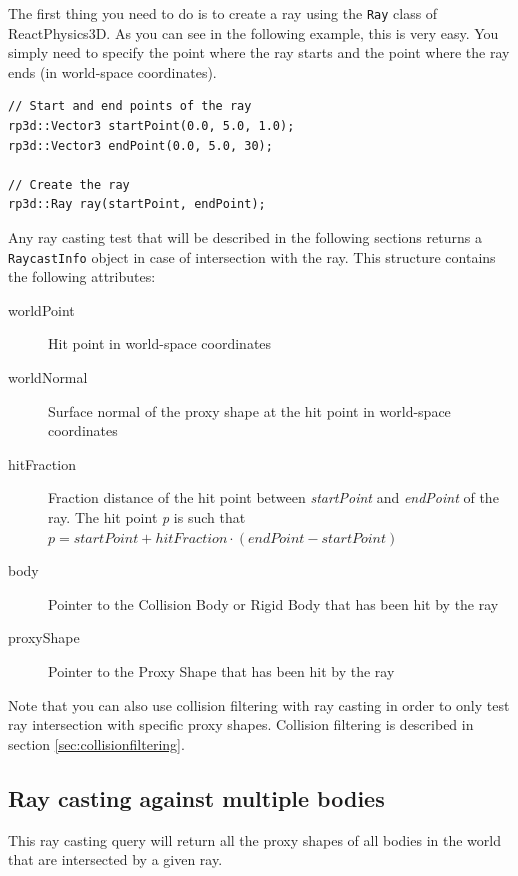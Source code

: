 \documentclass[a4paper,12pt]{article}
\begin{document}
    The first thing you need to do is to create a ray using the \texttt{Ray} class of ReactPhysics3D. As you can see in the following example, this is very easy. You
    simply need to specify the point where the ray starts and the point where the ray ends (in world-space coordinates). \\

    \begin{lstlisting}
// Start and end points of the ray
rp3d::Vector3 startPoint(0.0, 5.0, 1.0);
rp3d::Vector3 endPoint(0.0, 5.0, 30);

// Create the ray
rp3d::Ray ray(startPoint, endPoint);
  \end{lstlisting}

    \vspace{0.6cm}

    Any ray casting test that will be described in the following sections returns a \texttt{RaycastInfo} object in case of intersection with the ray.
    This structure contains the following attributes: \\

    \begin{description}
         \item[worldPoint] Hit point in world-space coordinates
         \item[worldNormal] Surface normal of the proxy shape at the hit point in world-space coordinates
         \item[hitFraction] Fraction distance of the hit point between \emph{startPoint}  and \emph{endPoint} of the ray. The hit point \emph{p} is such that
           $p = startPoint + hitFraction \cdot (endPoint - startPoint)$
         \item[body] Pointer to the Collision Body or Rigid Body that has been hit by the ray
         \item[proxyShape] Pointer to the Proxy Shape that has been hit by the ray
    \end{description}

    Note that you can also use collision filtering with ray casting in order to only test ray intersection with specific proxy shapes.
    Collision filtering is described in section \ref{sec:collisionfiltering}.

    \subsection{Ray casting against multiple bodies}

    This ray casting query will return all the proxy shapes of all bodies in the world that are intersected by a given ray.
\end{document}
